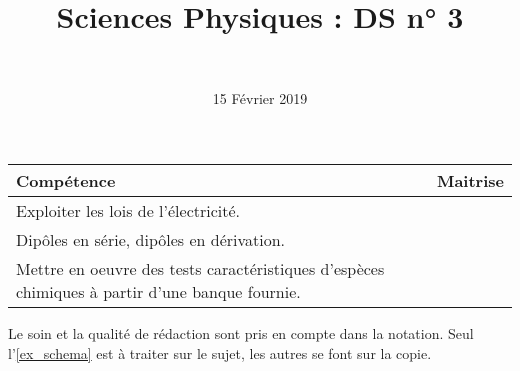 \documentclass[a4paper,11pt]{exam}
\author{\ }
\date{15 Février 2019}
\title{Sciences Physiques : DS n° 3}
\begin{document}
%	


	\maketitle


\begin{small}
	\begin{center}
		\begin{tabular}{|@{\ }l@{}|@{\ }c@{\ }|}
			\hline
			\textbf{Compétence} & \textbf{Maitrise} \\
			\hline
			 Exploiter les lois de l’électricité. \ \ &  \ \ \ \\
			\hline
			Dipôles en série, dipôles en dérivation. &  \\
			\hline			
			Mettre en oeuvre des tests caractéristiques d’espèces chimiques à partir d’une banque fournie.  &  \\
			\hline
			
		\end{tabular}
	\end{center}
\end{small}	
%	

Le soin et la qualité de rédaction sont pris en compte dans la notation.
Seul l'\ref{ex_schema} est à traiter sur le sujet, les autres se font sur la copie.

\vspace*{-0.5cm}
%






\newpage


\newpage



\newpage



\newpage





\ \label{LastPage}
\end{document}
